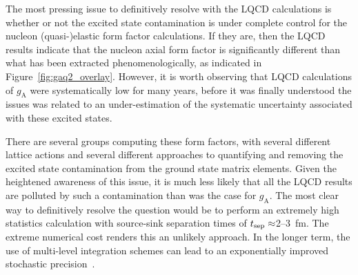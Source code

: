 The most pressing issue to definitively resolve with the LQCD calculations is whether or not the excited state contamination is under complete control for the nucleon (quasi-)elastic form factor calculations.
If they are, then the LQCD results indicate that the nucleon axial form factor is significantly different than what has been extracted phenomenologically, as indicated in Figure~\ref{fig:gaq2_overlay}.
However, it is worth observing that LQCD calculations of $g_{\mathrm{A}}$ were systematically low for many years, before it was finally understood the issues was related to an under-estimation of the systematic uncertainty associated with these excited states.

There are several groups computing these form factors, with several different lattice actions and several different approaches to quantifying and removing the excited state contamination from the ground state matrix elements.
Given the heightened awareness of this issue, it is much less likely that all the LQCD results are polluted by such a contamination than was the case for $g_{\mathrm{A}}$.
The most clear way to definitively resolve the question would be to perform an extremely high statistics calculation with source-sink separation times of $t_{\rm sep}\approx$2--3~fm.  The extreme numerical cost
renders this an unlikely approach.
In the longer term, the use of multi-level integration schemes can lead to an exponentially improved stochastic precision~\cite{Ce:2016idq}.

